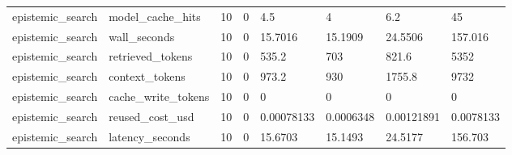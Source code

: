 \begin{tabular}{llllllll}
epistemic\_search & model\_cache\_hits & 10 & 0 & 4.5 & 4 & 6.2 & 45 \\
epistemic\_search & wall\_seconds & 10 & 0 & 15.7016 & 15.1909 & 24.5506 & 157.016 \\
epistemic\_search & retrieved\_tokens & 10 & 0 & 535.2 & 703 & 821.6 & 5352 \\
epistemic\_search & context\_tokens & 10 & 0 & 973.2 & 930 & 1755.8 & 9732 \\
epistemic\_search & cache\_write\_tokens & 10 & 0 & 0 & 0 & 0 & 0 \\
epistemic\_search & reused\_cost\_usd & 10 & 0 & 0.00078133 & 0.0006348 & 0.00121891 & 0.0078133 \\
epistemic\_search & latency\_seconds & 10 & 0 & 15.6703 & 15.1493 & 24.5177 & 156.703 \\
\hline
\end{tabular}
